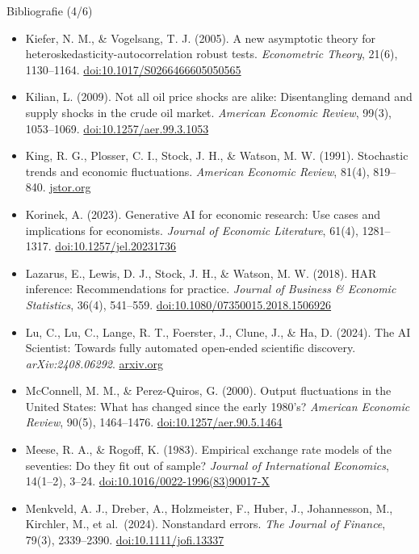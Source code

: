 \begin{frame}{Bibliografie (4/6)}
\itemsize{\tiny}
\begin{itemize}
    \item Kiefer, N. M., \& Vogelsang, T. J. (2005). A new asymptotic theory for heteroskedasticity-autocorrelation robust tests. \textit{Econometric Theory}, 21(6), 1130--1164. \href{https://doi.org/10.1017/S0266466605050565}{doi:10.1017/S0266466605050565}
    \item Kilian, L. (2009). Not all oil price shocks are alike: Disentangling demand and supply shocks in the crude oil market. \textit{American Economic Review}, 99(3), 1053--1069. \href{https://doi.org/10.1257/aer.99.3.1053}{doi:10.1257/aer.99.3.1053}
    \item King, R. G., Plosser, C. I., Stock, J. H., \& Watson, M. W. (1991). Stochastic trends and economic fluctuations. \textit{American Economic Review}, 81(4), 819--840. \href{https://www.jstor.org/stable/2006644}{jstor.org}
    \item Korinek, A. (2023). Generative AI for economic research: Use cases and implications for economists. \textit{Journal of Economic Literature}, 61(4), 1281--1317. \href{https://doi.org/10.1257/jel.20231736}{doi:10.1257/jel.20231736}
    \item Lazarus, E., Lewis, D. J., Stock, J. H., \& Watson, M. W. (2018). HAR inference: Recommendations for practice. \textit{Journal of Business \& Economic Statistics}, 36(4), 541--559. \href{https://doi.org/10.1080/07350015.2018.1506926}{doi:10.1080/07350015.2018.1506926}
    \item Lu, C., Lu, C., Lange, R. T., Foerster, J., Clune, J., \& Ha, D. (2024). The AI Scientist: Towards fully automated open-ended scientific discovery. \textit{arXiv:2408.06292}. \href{https://arxiv.org/abs/2408.06292}{arxiv.org}
    \item McConnell, M. M., \& Perez-Quiros, G. (2000). Output fluctuations in the United States: What has changed since the early 1980's? \textit{American Economic Review}, 90(5), 1464--1476. \href{https://doi.org/10.1257/aer.90.5.1464}{doi:10.1257/aer.90.5.1464}
    \item Meese, R. A., \& Rogoff, K. (1983). Empirical exchange rate models of the seventies: Do they fit out of sample? \textit{Journal of International Economics}, 14(1--2), 3--24. \href{https://doi.org/10.1016/0022-1996(83)90017-X}{doi:10.1016/0022-1996(83)90017-X}
    \item Menkveld, A. J., Dreber, A., Holzmeister, F., Huber, J., Johannesson, M., Kirchler, M., et al.\ (2024). Nonstandard errors. \textit{The Journal of Finance}, 79(3), 2339--2390. \href{https://doi.org/10.1111/jofi.13337}{doi:10.1111/jofi.13337}

\end{itemize}
\end{frame}
